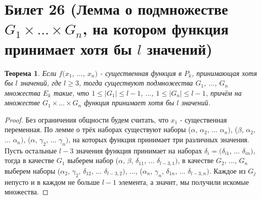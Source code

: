 \documentclass[a4paper, 12pt]{article}
\theoremstyle{definition}
\theoremstyle{plain}
\newtheorem*{theorem}{Теорема}
\theoremstyle{remark}
\begin{document}
  \section{Билет 26 (Лемма о подмножестве $G_1\times\ldots\times G_n$, на котором функция принимает хотя бы $l$ значений)}
  \begin{theorem}
    Если $f(x_1$, $\ldots$, $x_n)$ - существенная функция в $P_k$, принимающая хотя бы $l$ значений, где $l\geqslant3$, тогда существуют подмножества $G_1$, $\ldots$, $G_n$ множества $E_k$ такие, что $1\leqslant|G_1|\leqslant l-1$, $\ldots$, $1\leqslant|G_n|\leqslant l-1$, причём на множестве $G_1\times\ldots\times G_n$ функция принимает хотя бы $l$ значений.
  \end{theorem}
  \begin{proof}
    Без ограничения общности будем считать, что $x_1$ - существенная переменная. По лемме о трёх наборах существуют наборы ($\alpha$, $\alpha_2$, $\ldots$ $\alpha_n)$, ($\beta$, $\alpha_2$, $\ldots$ $\alpha_n)$, ($\alpha$, $\gamma_2$, $\ldots$ $\gamma_n)$, на которых функция принимает три различных значения. Пусть остальные $l-3$ значения функция принимает на наборах $\delta_i=(\delta_{i1}$, $\ldots$ $\delta_{in})$, тогда в качестве $G_1$ выберем набор ($\alpha$, $\beta$, $\delta_{11}$, $\ldots$ $\delta_{l-3,1})$, в качестве $G_2$, $\ldots$, $G_n$ выберем наборы ($\alpha_2$, $\gamma_2$, $\delta_{12}$, $\ldots$ $\delta_{l-3,2})$, $\ldots$, ($\alpha_n$, $\gamma_n$, $\delta_{1n}$, $\ldots$ $\delta_{l-3,n})$. Каждое из $G_j$ непусто и в каждом не больше $l-1$ элемента, а значит, мы получили искомые множества.
  \end{proof}
\end{document}
